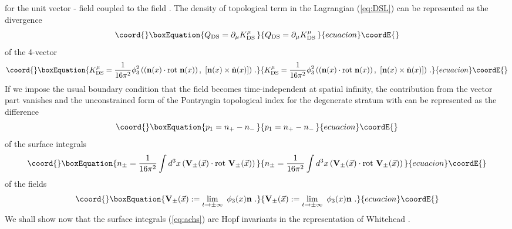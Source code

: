 \documentclass[a4paper,12pt]{article}
\begin{document}
for the unit vector \coordHE{} - field  coupled to the field \coordHE{}.
The density of topological term \coordHE{} in the Lagrangian (\ref{eq:DSL})
can be represented as the divergence
\begin{equation}\coord{}\boxEquation{
Q_{\rm DS} = \partial_\mu K_{\rm DS}^\mu\,
}{
Q_{\rm DS} = \partial_\mu K_{\rm DS}^\mu\,
}{ecuacion}\coordE{}\end{equation}
of the 4-vector
\begin{equation}\coord{}\boxEquation{
K_{\rm DS}^\mu = \frac{1}{16\pi^2}\phi_3^2 \left(  (\mathbf{n}(x)
\cdot \mbox{rot}\
\mathbf{n}(x))\,, \
[\mathbf{n}(x) \times \dot{\mathbf{n}}(x)] \right)\,.
}{
K_{\rm DS}^\mu = \frac{1}{16\pi^2}\phi_3^2 \left(  (\mathbf{n}(x)
\cdot \mbox{rot}\
\mathbf{n}(x))\,, \
[\mathbf{n}(x) \times \dot{\mathbf{n}}(x)] \right)\,.
}{ecuacion}\coordE{}\end{equation}
If we impose the usual boundary condition that the field \coordHE{}
becomes time-independent at spatial infinity,  the contribution from the
vector part  \myHighlight{$K_{\rm DS}^i$}\coordHE{} vanishes and
the unconstrained form of the Pontryagin topological index \coordHE{}
for the degenerate stratum with \myHighlight{$\mbox{rank}\|S\|=1$}\coordHE{} can be represented
as the difference
\begin{equation}\coord{}\boxEquation{
p_1 = n_+  - n_-\,
}{
p_1 = n_+  - n_-\,
}{ecuacion}\coordE{}\end{equation}
of the surface integrals
\begin{equation}\coord{}\boxEquation{
\label{eq:achs}
n_{\pm} = \frac{1}{16\pi^2}\int d^3x
\left( {\mathbf{V}}_{\pm}(\vec{x})\cdot \mbox{rot}\
{\mathbf{V}}_{\pm} (\vec{x}) \right)\,
}{
n_{\pm} = \frac{1}{16\pi^2}\int d^3x
\left( {\mathbf{V}}_{\pm}(\vec{x})\cdot \mbox{rot}\
{\mathbf{V}}_{\pm} (\vec{x}) \right)\,
}{ecuacion}\coordE{}\end{equation}
of the fields
\begin{equation}\coord{}\boxEquation{
{\mathbf{V}}_{\pm}(\vec{x}) := \lim_{t \to \pm \infty}\ \phi_3(x){\mathbf{n}} ~.
}{
{\mathbf{V}}_{\pm}(\vec{x}) := \lim_{t \to \pm \infty}\ \phi_3(x){\mathbf{n}} ~.
}{ecuacion}\coordE{}\end{equation}
We shall show now that the surface integrals (\ref{eq:achs}) are
Hopf invariants in the representation of Whitehead \cite{Whitehead}.
\end{document}

